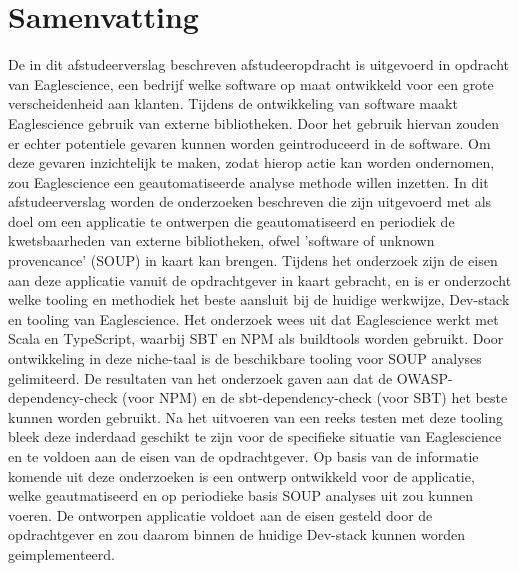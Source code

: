 


\chapter{Samenvatting}\label{ch:samenvatting}

De in dit afstudeerverslag beschreven afstudeeropdracht is uitgevoerd in opdracht van Eaglescience, een bedrijf welke software op maat ontwikkeld voor een grote verscheidenheid aan klanten. Tijdens de ontwikkeling van software maakt Eaglescience gebruik van externe bibliotheken. Door het gebruik hiervan zouden er echter potentiele gevaren kunnen worden geintroduceerd in de software. Om deze gevaren inzichtelijk te maken, zodat hierop actie kan worden ondernomen, zou Eaglescience een geautomatiseerde analyse methode willen inzetten. In dit afstudeerverslag worden de onderzoeken beschreven die zijn uitgevoerd met als doel om een applicatie te ontwerpen die geautomatiseerd en periodiek de kwetsbaarheden van externe bibliotheken, ofwel 'software of unknown provencance' (SOUP) in kaart kan brengen.
Tijdens het onderzoek zijn de eisen aan deze applicatie vanuit de opdrachtgever in kaart gebracht, en is er onderzocht welke tooling en methodiek het beste aansluit bij de huidige werkwijze, Dev-stack en tooling van Eaglescience. Het onderzoek wees uit dat Eaglescience werkt met Scala en TypeScript, waarbij SBT en NPM als buildtools worden gebruikt. Door ontwikkeling in deze niche-taal is de beschikbare tooling voor SOUP analyses gelimiteerd. De resultaten van het onderzoek gaven aan dat de OWASP-dependency-check (voor NPM) en de sbt-dependency-check (voor SBT) het beste kunnen worden gebruikt. Na het uitvoeren van een reeks testen met deze tooling bleek deze inderdaad geschikt te zijn voor de specifieke situatie van Eaglescience en te voldoen aan de eisen van de opdrachtgever. Op basis van de informatie komende uit deze onderzoeken is een ontwerp ontwikkeld voor de applicatie, welke geautmatiseerd en op periodieke basis SOUP analyses uit zou kunnen voeren. De ontworpen applicatie voldoet aan de eisen gesteld door de opdrachtgever en zou daarom binnen de huidige Dev-stack kunnen worden geimplementeerd.





\vfill

